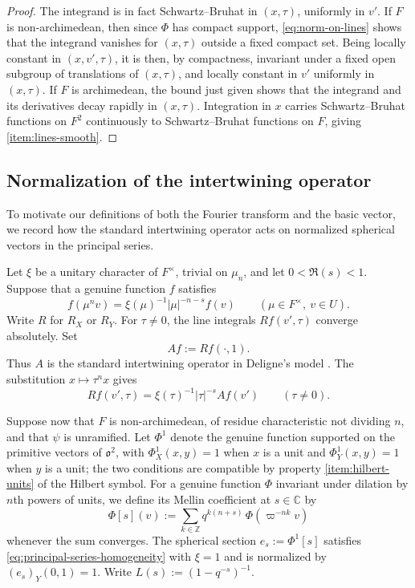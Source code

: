 \documentclass[reqno]{amsart}
\theoremstyle{plain}
\theoremstyle{definition}
\theoremstyle{itplain}
\numberwithin{equation}{section}
\numberwithin{theorem}{section}
\begin{document}
\begin{proof}
  The integrand is in fact Schwartz--Bruhat in $(x, \tau)$, uniformly in $v'$.  If $F$ is non-archimedean, then since $\Phi$ has compact support, \eqref{eq:norm-on-lines} shows that the integrand vanishes for $(x, \tau)$ outside a fixed compact set.  Being locally constant in $(x, v', \tau)$, it is then, by compactness, invariant under a fixed open subgroup of translations of $(x, \tau)$, and locally constant in $v'$ uniformly in $(x, \tau)$.  If $F$ is archimedean, the bound just given shows that the integrand and its derivatives decay rapidly in $(x, \tau)$.  Integration in $x$ carries Schwartz--Bruhat functions on $F^2$ continuously to Schwartz--Bruhat functions on $F$, giving \eqref{item:lines-smooth}.
\end{proof}

\subsection{Normalization of the intertwining operator}\label{sec:intertwining}
To motivate our definitions of both the Fourier transform and the basic vector, we record how the standard intertwining operator acts on normalized spherical vectors in the principal series.

Let $\xi$ be a unitary character of $F^\times$, trivial on $\mu_n$, and let $0 < \Re(s) < 1$.  Suppose that a genuine function $f$ satisfies
\begin{equation}\label{eq:principal-series-homogeneity}
  f(\mu^n v) = \xi(\mu)^{-1} \lvert \mu \rvert^{-n-s} f(v)
  \qquad (\mu \in F^\times,\ v \in U).
\end{equation}
Write $R$ for $R_X$ or $R_Y$.  For $\tau \neq 0$, the line integrals $R f(v', \tau)$ converge absolutely.  Set
\begin{equation*}
  A f := R f(\cdot, 1).
\end{equation*}
Thus $A$ is the standard intertwining operator in Deligne's model \cite[\S6.3]{SB_1978-1979__21__244_0}.  The substitution $x \mapsto \tau^n x$ gives
\begin{equation}\label{eq:radon-homogeneity}
  R f(v', \tau) = \xi(\tau)^{-1} \lvert \tau \rvert^{-s} A f(v') \qquad (\tau \neq 0).
\end{equation}

Suppose now that $F$ is non-archimedean, of residue characteristic not dividing $n$, and that $\psi$ is unramified.  Let $\Phi^1$ denote the genuine function supported on the primitive vectors of $\mathfrak{o}^2$, with $\Phi^1_X(x, y) = 1$ when $x$ is a unit and $\Phi^1_Y(x, y) = 1$ when $y$ is a unit; the two conditions are compatible by property \eqref{item:hilbert-units} of the Hilbert symbol.  For a genuine function $\Phi$ invariant under dilation by $n$th powers of units, we define its Mellin coefficient at $s \in \mathbb{C}$ by
\begin{equation*}
  \Phi[s](v) := \sum_{k \in \mathbb{Z}} q^{k (n + s)} \, \Phi(\varpi^{-n k} v)
\end{equation*}
whenever the sum converges.  The spherical section $e_s := \Phi^1[s]$ satisfies \eqref{eq:principal-series-homogeneity} with $\xi = 1$ and is normalized by $(e_s)_Y(0, 1) = 1$.  Write $L(s) := (1 - q^{-s})^{-1}$.
\end{document}
